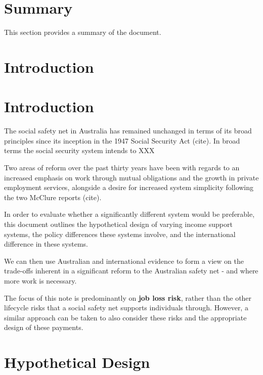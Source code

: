 \documentclass[
  letterpaper,
  DIV=11,
  numbers=noendperiod]{scrreprt}
\begin{document}
\hypertarget{summary-1}{%
\chapter{Summary}\label{summary-1}}

This section provides a summary of the document.


\hypertarget{introduction}{%
\chapter{Introduction}\label{introduction}}


\hypertarget{introduction-1}{%
\chapter{Introduction}\label{introduction-1}}

The social safety net in Australia has remained unchanged in terms of
its broad principles since its inception in the 1947 Social Security Act
(cite). In broad terms the social security system intends to XXX

Two areas of reform over the past thirty years have been with regards to
an increased emphasis on work through mutual obligations and the growth
in private employment services, alongside a desire for increased system
simplicity following the two McClure reports (cite).

In order to evaluate whether a significantly different system would be
preferable, this document outlines the hypothetical design of varying
income support systems, the policy differences these systems involve,
and the international difference in these systems.

We can then use Australian and international evidence to form a view on
the trade-offs inherent in a significant reform to the Australian safety
net - and where more work is necessary.

The focus of this note is predominantly on \textbf{job loss risk},
rather than the other lifecycle risks that a social safety net supports
individuals through. However, a similar approach can be taken to also
consider these risks and the appropriate design of these payments.


\hypertarget{hypothetical-design}{%
\chapter{Hypothetical Design}\label{hypothetical-design}}
\end{document}
